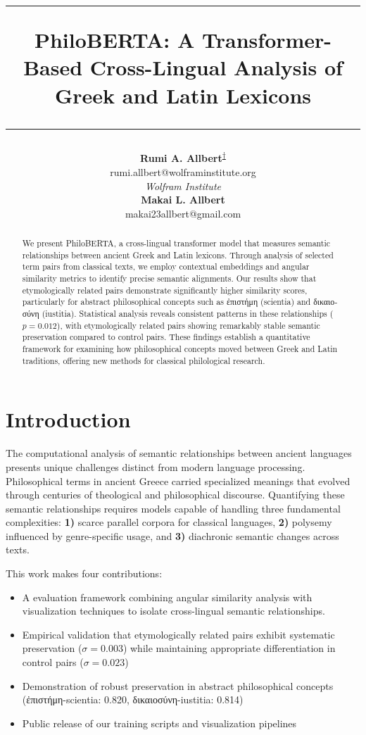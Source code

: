 \documentclass[11pt]{article} %
\title{
    \vspace{-2em}
    {\color{linecolor}\hrule height 0.5pt}
    \vspace{1.5em}
    {\LARGE \textbf{PhiloBERTA: A Transformer-Based Cross-Lingual Analysis of Greek and Latin Lexicons}}
    \vspace{1.5em}
    {\color{linecolor}\hrule height 0.5pt}
    \vspace{1em}
}
\author{
    \begin{minipage}{0.45\textwidth}
        \centering
        {\large \textbf{Rumi A. Allbert}\textsuperscript{\href{https://orcid.org/0009-0008-7963-4087}{†}}}\\[0.2em]
        {\small\ttfamily rumi.allbert@wolframinstitute.org}\\[0.2em]
        {\normalsize \textit{Wolfram Institute}}
    \end{minipage}%
    \hfill
    \begin{minipage}{0.45\textwidth}
        \centering
        {\large \textbf{Makai L. Allbert}}\\[0.2em]
        {\small\ttfamily makai23allbert@gmail.com}\\[0.2em]
        {\normalsize \textit{}}
    \end{minipage}
}
\date{}
\begin{document}
\maketitle

\begin{abstract}
We present PhiloBERTA, a cross-lingual transformer model that measures semantic relationships between ancient Greek and Latin lexicons. Through analysis of selected term pairs from classical texts, we employ contextual embeddings and angular similarity metrics to identify precise semantic alignments. Our results show that etymologically related pairs demonstrate significantly higher similarity scores, particularly for abstract philosophical concepts such as \textgreek{ἐπιστήμη} (scientia) and \textgreek{δικαιοσύνη} (iustitia). Statistical analysis reveals consistent patterns in these relationships ($p=0.012$), with etymologically related pairs showing remarkably stable semantic preservation compared to control pairs. These findings establish a quantitative framework for examining how philosophical concepts moved between Greek and Latin traditions, offering new methods for classical philological research.
\end{abstract}

\section{Introduction}
The computational analysis of semantic relationships between ancient languages presents unique challenges distinct from modern language processing. Philosophical terms in ancient Greece carried specialized meanings that evolved through centuries of theological and philosophical discourse. Quantifying these semantic relationships requires models capable of handling three fundamental complexities: \textbf{1)} scarce parallel corpora for classical languages, \textbf{2)} polysemy influenced by genre-specific usage, and \textbf{3)} diachronic semantic changes across texts.

This work makes four contributions:
\begin{itemize}
\item A evaluation framework combining angular similarity analysis with visualization techniques to isolate cross-lingual semantic relationships.
\item Empirical validation that etymologically related pairs exhibit systematic preservation ($\sigma = 0.003$) while maintaining appropriate differentiation in control pairs ($\sigma = 0.023$)
\item Demonstration of robust preservation in abstract philosophical concepts (\textgreek{ἐπιστήμη}-scientia: 0.820, \textgreek{δικαιοσύνη}-iustitia: 0.814)
\item Public release of our training scripts and visualization pipelines
\end{itemize}
\end{document}
